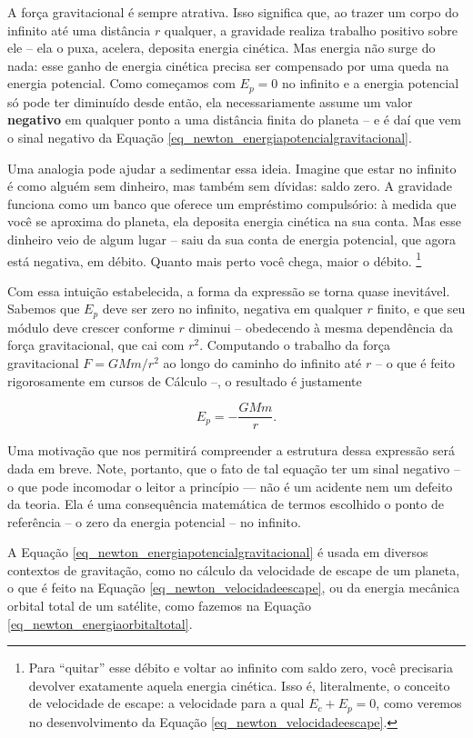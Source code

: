 A força gravitacional é sempre atrativa. Isso significa que, ao trazer
um corpo do infinito até uma distância $r$ qualquer, a gravidade realiza
trabalho positivo sobre ele -- ela o puxa, acelera, deposita energia
cinética. Mas energia não surge do nada: esse ganho de energia cinética
precisa ser compensado por uma queda na energia potencial. Como
começamos com $E_p = 0$ no infinito e a energia potencial só pode ter
diminuído desde então, ela necessariamente assume um valor
\textbf{negativo} em qualquer ponto a uma distância finita do planeta -- e é daí que vem o sinal negativo da Equação \eqref{eq_newton_energiapotencialgravitacional}.

Uma analogia pode ajudar a sedimentar essa ideia. Imagine que estar no infinito é como alguém sem dinheiro, mas também sem dívidas: saldo zero. A gravidade funciona como um banco que oferece um empréstimo compulsório: à medida que você
se aproxima do planeta, ela deposita energia cinética na sua conta. Mas
esse dinheiro veio de algum lugar -- saiu da sua conta de energia
potencial, que agora está negativa, em débito. Quanto mais perto você
chega, maior o débito. \footnote{Para ``quitar'' esse débito e voltar ao infinito
com saldo zero, você precisaria devolver exatamente aquela energia
cinética. Isso é, literalmente, o conceito de velocidade de escape: a
velocidade para a qual $E_c + E_p = 0$, como veremos no desenvolvimento da Equação \eqref{eq_newton_velocidadeescape}.}

Com essa intuição estabelecida, a forma da expressão se torna quase
inevitável. Sabemos que $E_p$ deve ser zero no infinito, negativa em
qualquer $r$ finito, e que seu módulo deve crescer conforme $r$
diminui -- obedecendo à mesma dependência da força gravitacional, que
cai com $r^2$. Computando o trabalho da força gravitacional $F = GMm/r^2$ ao longo do caminho do infinito
até $r$ -- o que é feito rigorosamente em cursos de Cálculo --, o resultado é justamente

\[
    E_p = -\frac{GMm}{r}.
\]

Uma motivação que nos permitirá compreender a estrutura dessa expressão será dada em breve. Note, portanto, que o fato de tal equação ter um sinal negativo -- o que pode incomodar o leitor a princípio — não é um acidente nem um defeito da teoria. Ela é uma consequência matemática de termos escolhido o ponto de referência -- o zero da energia potencial -- no infinito.



A Equação \eqref{eq_newton_energiapotencialgravitacional} é usada em diversos contextos de gravitação, como no cálculo da velocidade de escape de um planeta, o que é feito na Equação \eqref{eq_newton_velocidadeescape}, ou da energia mecânica orbital total de um satélite, como fazemos na Equação \eqref{eq_newton_energiaorbitaltotal}.

